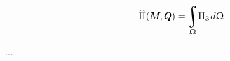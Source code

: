 \begin{otherlanguage}{russian}
\nopagebreak\vspace{-0.1em}\begin{equation*}
\widehat{\Pi}(\mathboldM, \mathboldQ) = \hspace{-0.2ex} \integral\displaylimits_{\surface} \hspace{-0.4ex} \Pi_3 \hspace{.2ex} d\surface
\end{equation*}

...



\end{otherlanguage}



\label{para:variationalmethodforonedimension}

